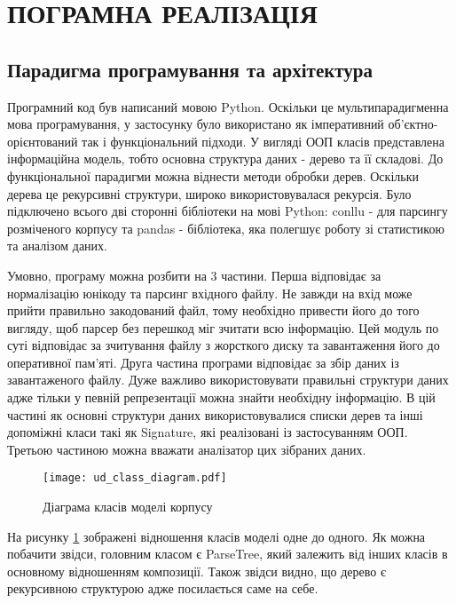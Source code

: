 \section{ПОГРАМНА РЕАЛІЗАЦІЯ}

\subsection{Парадигма програмування та архітектура}
Програмний код був написаний мовою Python. Оскільки це мультипарадигменна мова програмування,
у застосунку було використано як імперативний об'єктно-орієнтований так і функціональний підходи.
У вигляді ООП класів представлена інформаційна модель, тобто основна структура
даних - дерево та її складові. До функціональної парадигми можна віднести методи обробки
дерев. Оскільки дерева це рекурсивні структури, широко використовувалася рекурсія.
Було підключено всього дві сторонні бібліотеки на мові Python: conllu - для парсингу розміченого
корпусу та pandas - бібліотека, яка полегшує роботу зі статистикою та аналізом даних.

Умовно, програму можна розбити на 3 частини. Перша відповідає за нормалізацію
юнікоду та парсинг вхідного файлу. Не завжди на вхід може прийти правильно
закодований файл, тому необхідно привести його до того вигляду, щоб парсер без
перешкод міг зчитати всю інформацію. Цей модуль по суті відповідає за зчитування
файлу з жорсткого диску та завантаження його до оперативної пам'яті. Друга частина
програми відповідає за збір даних із завантаженого файлу. Дуже важливо використовувати
правильні структури даних адже тільки у певній репрезентації можна знайти необхідну
інформацію. В цій частині як основні структури даних використовувалися
списки дерев та інші допоміжні класи такі як Signature, які реалізовані із застосуванням ООП.
Третьою частиною можна вважати аналізатор цих зібраних даних.

\begin{figure}[p]
  \begin{center}
    \texttt{[image: ud\_class\_diagram.pdf]}
  \end{center}
  \caption{Діаграма класів моделі корпусу}
  \label{img:class_diagram}
\end{figure}
\newpage

На рисунку \ref{img:class_diagram} зображені відношення класів моделі одне до одного.
Як можна побачити звідси, головним класом є ParseTree, який залежить від інших класів
в основному відношенням композиції. Також звідси видно, що дерево є рекурсивною
структурою адже посилається саме на себе.

